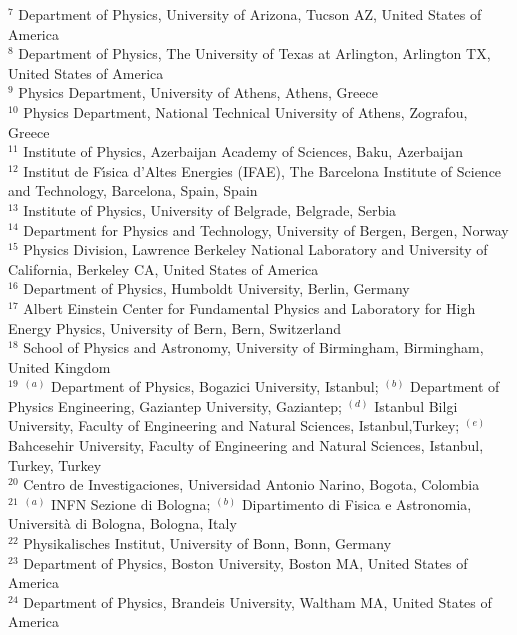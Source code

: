 \begin{flushleft}
$^{7}$ Department of Physics, University of Arizona, Tucson AZ, United States of America\\
$^{8}$ Department of Physics, The University of Texas at Arlington, Arlington TX, United States of America\\
$^{9}$ Physics Department, University of Athens, Athens, Greece\\
$^{10}$ Physics Department, National Technical University of Athens, Zografou, Greece\\
$^{11}$ Institute of Physics, Azerbaijan Academy of Sciences, Baku, Azerbaijan\\
$^{12}$ Institut de F{\'\i}sica d'Altes Energies (IFAE), The Barcelona Institute of Science and Technology, Barcelona, Spain, Spain\\
$^{13}$ Institute of Physics, University of Belgrade, Belgrade, Serbia\\
$^{14}$ Department for Physics and Technology, University of Bergen, Bergen, Norway\\
$^{15}$ Physics Division, Lawrence Berkeley National Laboratory and University of California, Berkeley CA, United States of America\\
$^{16}$ Department of Physics, Humboldt University, Berlin, Germany\\
$^{17}$ Albert Einstein Center for Fundamental Physics and Laboratory for High Energy Physics, University of Bern, Bern, Switzerland\\
$^{18}$ School of Physics and Astronomy, University of Birmingham, Birmingham, United Kingdom\\
$^{19}$ $^{(a)}$ Department of Physics, Bogazici University, Istanbul; $^{(b)}$ Department of Physics Engineering, Gaziantep University, Gaziantep; $^{(d)}$ Istanbul Bilgi University, Faculty of Engineering and Natural Sciences, Istanbul,Turkey; $^{(e)}$ Bahcesehir University, Faculty of Engineering and Natural Sciences, Istanbul, Turkey, Turkey\\
$^{20}$ Centro de Investigaciones, Universidad Antonio Narino, Bogota, Colombia\\
$^{21}$ $^{(a)}$ INFN Sezione di Bologna; $^{(b)}$ Dipartimento di Fisica e Astronomia, Universit{\`a} di Bologna, Bologna, Italy\\
$^{22}$ Physikalisches Institut, University of Bonn, Bonn, Germany\\
$^{23}$ Department of Physics, Boston University, Boston MA, United States of America\\
$^{24}$ Department of Physics, Brandeis University, Waltham MA, United States of America\\

\end{flushleft}
